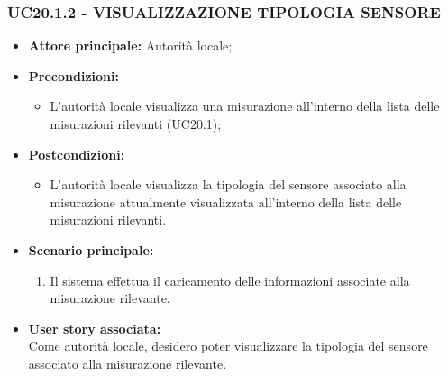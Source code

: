 \subsubsection{UC20.1.2 - VISUALIZZAZIONE TIPOLOGIA SENSORE}
\begin{itemize}
    \item \textbf{Attore principale:} Autorità locale;
    \item \textbf{Precondizioni:}
        \begin{itemize}
                \item L'autorità locale visualizza una misurazione all'interno della lista delle misurazioni rilevanti (UC20.1);
        \end{itemize}
    \item \textbf{Postcondizioni:}
        \begin{itemize}
            \item L'autorità locale visualizza la tipologia del sensore associato alla misurazione attualmente visualizzata all'interno della lista delle misurazioni rilevanti.
        \end{itemize}
    \item \textbf{Scenario principale:}
        \begin{enumerate}
            \item Il sistema effettua il caricamento delle informazioni associate alla misurazione rilevante.
        \end{enumerate}
    \item \textbf{User story associata:} \\
    Come autorità locale, desidero poter visualizzare la tipologia del sensore associato alla misurazione rilevante.
\end{itemize}